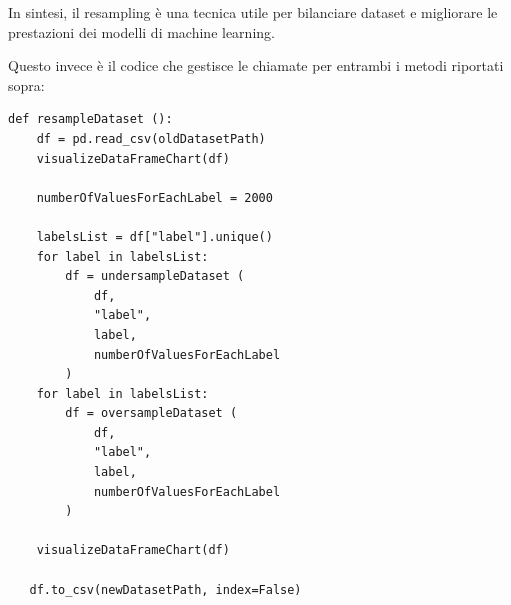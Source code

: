 In sintesi, il resampling è una tecnica utile per bilanciare dataset e migliorare le prestazioni dei modelli di machine learning. 

Questo invece è il codice che gestisce le chiamate per entrambi i metodi riportati sopra:
\begin{verbatim}
def resampleDataset ():
    df = pd.read_csv(oldDatasetPath)
    visualizeDataFrameChart(df)

    numberOfValuesForEachLabel = 2000

    labelsList = df["label"].unique()
    for label in labelsList:
        df = undersampleDataset (
            df, 
            "label", 
            label, 
            numberOfValuesForEachLabel
        )
    for label in labelsList:
        df = oversampleDataset (
            df, 
            "label", 
            label, 
            numberOfValuesForEachLabel
        )

    visualizeDataFrameChart(df)

   df.to_csv(newDatasetPath, index=False)
\end{verbatim}


